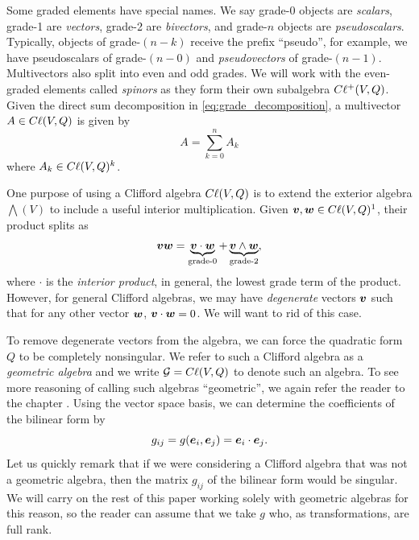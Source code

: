 \documentclass{article}
\begin{document}
Some graded elements have special names. We say grade-0 objects are \emph{scalars}, grade-1 are \emph{vectors}, grade-2 are \emph{bivectors}, and grade-$n$ objects are \emph{pseudoscalars}. Typically, objects of grade-$(n-k)$ receive the prefix ``pseudo'', for example, we have pseudoscalars of grade-$(n-0)$ and \emph{pseudovectors} of grade-$(n-1)$. Multivectors also split into even and odd grades. We will work with the even-graded elements called \emph{spinors} as they form their own subalgebra $C\ell^+(V,Q)$. Given the direct sum decomposition in \cref{eq:grade_decomposition}, a multivector $A\in C\ell(V,Q)$ is given by
\begin{equation}
    \label{eq:grade_decomp_of_multivector}
A = \sum_{k=0}^n A_k
\end{equation}
where $A_k \in C\ell(V,Q)^k$.

One purpose of using a Clifford algebra $C\ell(V,Q)$ is to extend the exterior algebra $\bigwedge(V)$ to include a useful interior multiplication. Given $\boldsymbol{v},\boldsymbol{w}\in C\ell(V,Q)^1$, their product splits as
\begin{equation}
\label{eq:product_of_vectors}
    \boldsymbol{v}\boldsymbol{w}= \underbrace{\boldsymbol{v}\cdot \boldsymbol{w}}_{\textrm{grade-0}} +\underbrace{\boldsymbol{v}\wedge \boldsymbol{w}}_{\textrm{grade-2}},
\end{equation}
where $\cdot$ is the \emph{interior product}, in general, the lowest grade term of the product. However, for general Clifford algebras, we may have \emph{degenerate} vectors $\boldsymbol{v}$ such that for any other vector $\boldsymbol{w}$, $\boldsymbol{v}\cdot \boldsymbol{w}=0$. We will want to rid of this case.

To remove degenerate vectors from the algebra, we can force the quadratic form $Q$ to be completely nonsingular. We refer to such a Clifford algebra as a \emph{geometric algebra} and we write $\mathcal{G} = C\ell(V,Q)$ to denote such an algebra. To see more reasoning of calling such algebras ``geometric'', we again refer the reader to the chapter \cite{roman_metric_2008}. Using the vector space basis, we can determine the coefficients of the bilinear form by
\begin{equation}
g_{ij}=g(\boldsymbol{e}_i,\boldsymbol{e}_j)=\boldsymbol{e}_i \cdot \boldsymbol{e}_j.
\end{equation}
Let us quickly remark that if we were considering a Clifford algebra that was not a geometric algebra, then the matrix $g_{ij}$ of the bilinear form would be singular. We will carry on the rest of this paper working solely with geometric algebras for this reason, so the reader can assume that we take $g$ who, as transformations, are full rank.
\end{document}
